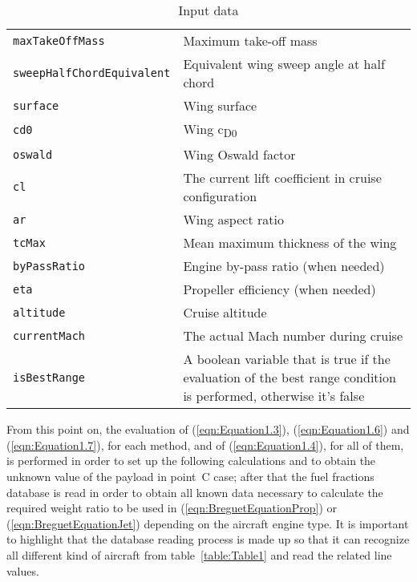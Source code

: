 \begin{table}[!ht]
\begin{tabular}{p{7cm}p{7.5cm}}
\toprule
\lstinline[language=Java]!maxTakeOffMass! & Maximum take-off mass \\[0.1	cm]
\lstinline[language=Java]!sweepHalfChordEquivalent! & Equivalent wing sweep angle at half chord \\[0.1cm]
\lstinline[language=Java]!surface! & Wing surface \\[0.1cm]
\lstinline[language=Java]!cd0!	& Wing c\textsubscript{D0} \\[0.1cm]
\lstinline[language=Java]!oswald!	& Wing Oswald factor \\[0.1cm]
\lstinline[language=Java]!cl!	& The current lift coefficient in cruise configuration \\[0.1cm]
\lstinline[language=Java]!ar!	& Wing aspect ratio \\[0.1cm]
\lstinline[language=Java]!tcMax! & Mean maximum thickness of the wing \\[0.1cm]
\lstinline[language=Java]!byPassRatio! & Engine by-pass ratio (when needed) \\[0.1cm]
\lstinline[language=Java]!eta! & Propeller efficiency (when needed) \\[0.1cm]
\lstinline[language=Java]!altitude! & Cruise altitude \\[0.1cm]
\lstinline[language=Java]!currentMach! & The actual Mach number during cruise \\[0.1cm]
\lstinline[language=Java]!isBestRange! & A boolean variable that is true if the evaluation of the best range condition is performed, otherwise it's false         \\
\bottomrule
\end{tabular}
\caption{Input data}
\label{table:Table2}
\end{table}
%
From this point on, the evaluation of (\ref{eqn:Equation1.3}), (\ref{eqn:Equation1.6}) and (\ref{eqn:Equation1.7}), for each method, and of (\ref{eqn:Equation1.4}), for all of them, is performed in order to set up the following calculations and to obtain the unknown value of the payload in point~C case; after that the fuel fractions database is read in order to obtain all known data necessary to calculate the required weight ratio to be used in (\ref{eqn:BreguetEquationProp}) or (\ref{eqn:BreguetEquationJet}) depending on the aircraft engine type. It is important to highlight that the database reading process is made up so that it can recognize all different kind of aircraft from table~\ref{table:Table1} and read the related line values.

